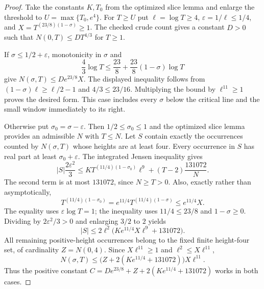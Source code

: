 \begin{proof}
Take the constants $K,T_0$ from the optimized slice lemma and enlarge
the threshold to $U=\max\{T_0,e^4\}$.
For $T\ge U$ put $\ell=\log T\ge4$, $\varepsilon=1/\ell\le1/4$,
and $X=T^{(23/8)(1-\sigma)}\ge1$.
The checked crude count gives a constant $D>0$ such that
$N(0,T)\le DT^{4/3}$ for $T\ge1$.

If $\sigma\le1/2+\varepsilon$, monotonicity in $\sigma$ and
\[
 \frac43\log T
 \le\frac{23}{8}+\frac{23}{8}(1-\sigma)\log T
\]
give $N(\sigma,T)\le De^{23/8}X$.
The displayed inequality follows from
$(1-\sigma)\ell\ge\ell/2-1$ and $4/3\le23/16$.
Multiplying the bound by $\ell^{11}\ge1$ proves the desired form.
This case includes every $\sigma$ below the critical line and the
small window immediately to its right.

Otherwise put $\sigma_0=\sigma-\varepsilon$.
Then $1/2\le\sigma_0\le1$ and the optimized slice lemma provides
an admissible $N$ with $T\le N$.
Let $S$ contain exactly the occurrences counted by $N(\sigma,T)$
whose heights are at least four.
Every occurrence in $S$ has real part at least
$\sigma_0+\varepsilon$.
The integrated Jensen inequality gives
\[
 |S|\frac{2\varepsilon^2}{3}
 \le K T^{(11/4)(1-\sigma_0)}\ell^9
       +(T-2)\frac{131072}{N}.
\]
The second term is at most $131072$, since $N\ge T>0$.
Also, exactly rather than asymptotically,
\[
 T^{(11/4)(1-\sigma_0)}
 =e^{11/4}T^{(11/4)(1-\sigma)}
 \le e^{11/4}X.
\]
The equality uses $\varepsilon\log T=1$; the inequality uses
$11/4\le23/8$ and $1-\sigma\ge0$.
Dividing by $2\varepsilon^2/3>0$ and enlarging $3/2$ to $2$ yields
\[
 |S|\le2\ell^2\bigl(Ke^{11/4}X\ell^9+131072\bigr).
\]
All remaining positive-height occurrences belong to the fixed finite
height-four set, of cardinality $Z=N(0,4)$.
Since $X\ell^{11}\ge1$ and $\ell^2\le X\ell^{11}$,
\[
 N(\sigma,T)
 \le\bigl(Z+2(Ke^{11/4}+131072)\bigr)X\ell^{11}.
\]
Thus the positive constant
$C=De^{23/8}+Z+2(Ke^{11/4}+131072)$ works in both cases.
\end{proof}
